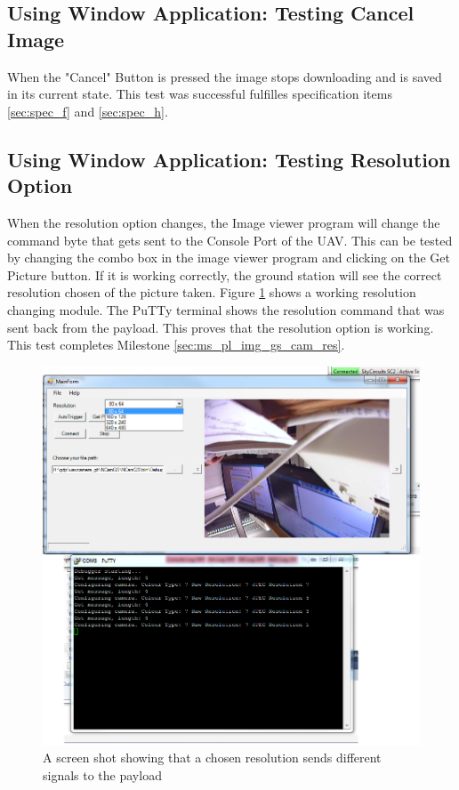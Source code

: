 \subsection{Using Window Application: Testing Cancel Image}
When the "Cancel" Button is pressed the image stops downloading and is saved in its current state. This test was successful fulfilles specification items \ref{sec:spec_f} and \ref{sec:spec_h}.

\subsection{Using Window Application: Testing Resolution Option}
\label{test_res_op}
When the resolution option changes, the Image viewer program will change the command byte that gets sent to the Console Port of the UAV. 
This can be tested by changing the combo box in the image viewer program and clicking on the Get Picture button.
If it is working correctly, the ground station will see the correct resolution chosen of the picture taken.
Figure \ref{resolution testing} shows a working resolution changing module. 
The PuTTy terminal shows the resolution command that was sent back from the payload.
This proves that the resolution option is working.
This test completes Milestone \ref{sec:ms_pl_img_gs_cam_res}.
\begin{figure}[H]
\begin{center}
\includegraphics[width=1.00\textwidth]{testing_screenshots/change_res_ncam_1.png} 
\end{center}
\caption{A screen shot showing that a chosen resolution sends different signals to the payload\label{resolution testing}}
\end{figure}

